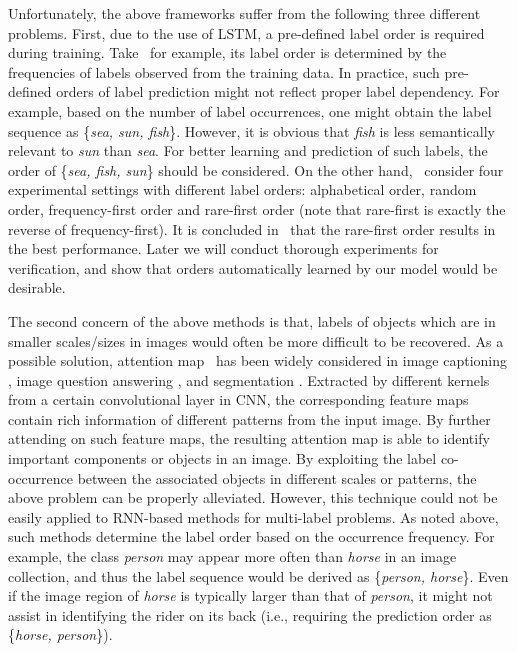 \documentclass[letterpaper]{article} %
\begin{document}
Unfortunately, the above frameworks suffer from the following three different problems. First, due to the use of LSTM, a pre-defined label order is required during training. Take~\cite{wang2016cnn} for example, its label order is determined by the frequencies of labels observed from the training data. In practice, such pre-defined orders of label prediction might not reflect proper label dependency. For example, based on the number of label occurrences, one might obtain the label sequence as \{\emph{sea, sun, fish}\}. However, it is obvious that \emph{fish} is less semantically relevant to \emph{sun} than \emph{sea}. For better learning and prediction of such labels, the order of \{\emph{sea, fish, sun}\} should be considered. On the other hand,~\cite{jin2016annotation} consider four experimental settings with different label orders: alphabetical order, random order, frequency-first order and rare-first order (note that rare-first is exactly the reverse of frequency-first). It is concluded in~\cite{jin2016annotation} that the rare-first order results in the best performance. Later we will conduct thorough experiments for verification, and show that orders automatically learned by our model would be desirable.

The second concern of the above methods is that, labels of objects which are in smaller scales/sizes in images would often be more difficult to be recovered. As a possible solution, attention map~\cite{xu2015show} has been widely considered in image captioning \cite{xu2015show}, image question answering \cite{yang2016stacked}, and segmentation \cite{hong2016learning}. Extracted by different kernels from a certain convolutional layer in CNN, the corresponding feature maps contain rich information of different patterns from the input image. By further attending on such feature maps, the resulting attention map is able to identify important components or objects in an image. By exploiting the label co-occurrence between the associated objects in different scales or patterns, the above problem can be properly alleviated. However, this technique could not be easily applied to RNN-based methods for multi-label problems. As noted above, such methods determine the label order based on the occurrence frequency. For example, the class \emph{person} may appear more often than \emph{horse} in an image collection, and thus the label sequence would be derived as \{\emph{person, horse}\}. Even if the image region of \emph{horse} is typically larger than that of \emph{person}, it might not assist in identifying the rider on its back (i.e., requiring the prediction order as \{\emph{horse, person}\}).
\end{document}
